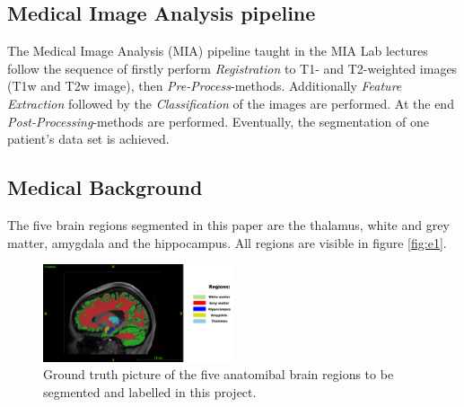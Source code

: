 \documentclass[journal]{IEEEtran}
\begin{document}
\subsection{Medical Image Analysis pipeline}
	The Medical Image Analysis (MIA) pipeline taught in the MIA Lab lectures follow the sequence of firstly perform {\itshape Registration} to T1- and T2-weighted images (T1w and T2w image), then {\itshape Pre-Process}-methods. Additionally {\itshape Feature Extraction} followed by the {\itshape Classification} of the images are performed. 
	At the end {\itshape Post-Processing}-methods are performed. Eventually, the segmentation of one patient's data set is achieved. 

\subsection{Medical Background}
	The five brain regions segmented in this paper are the thalamus, white and grey matter, amygdala and the hippocampus. All regions are visible in figure \ref{fig:e1}.

	\begin{figure}[h]
		\centering
		\includegraphics[width=0.5\textwidth]{T1native_all_regions_labelled.png}
		\caption{Ground truth picture of the five anatomibal brain regions to be segmented and labelled in this project.}
		\label{Figure:e1}
	\end{figure}
\end{document}
